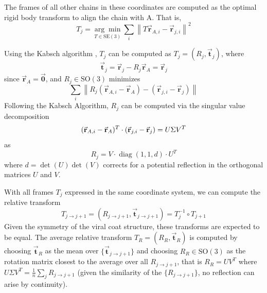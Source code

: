 The frames of all other chains in these coordinates are computed as the optimal rigid body transform to align the chain with A. That is,
\begin{equation}
T_j = \underset{T \in \mathrm{SE}(3)}{\arg\min} \sum_i \left\| T\vec{\mathbf{r}}_{A,i} - \vec{\mathbf{r}}_{j,i} \right\|^2
\end{equation}

Using the Kabsch algorithm \cite{Lawrence_2019}, $T_j$ can be computed as $T_j = (R_j, \vec{\mathbf{t}}_j)$, where 
\begin{equation}
    \vec{\mathbf{t}}_j= \vec{\mathbf{r}}_j - R_j\vec{\mathbf{r}}_A =\vec{\mathbf{r}}_j
\end{equation}    
since $\vec{\mathbf{r}}_A=\vec{\mathbf{0}}$, and $R_j \in \mathrm{SO}(3)$ minimizes 
\begin{equation}
\sum_{i} \left\| R_j(\vec{\mathbf{r}}_{A,i} - \vec{\mathbf{r}}_{A})  - (\vec{\mathbf{r}}_{j,i} - \vec{\mathbf{r}}_{j})\right\|
\end{equation}
Following the Kabsch Algorithm, $R_j$ can be computed via the singular value decomposition 
\begin{equation}
    (\vec{\mathbf{r}}_{A,i} - \vec{\mathbf{r}}_{A})^T  \cdot (\vec{\mathbf{r}}_{j,i} - \vec{\mathbf{r}}_{j}) = U\Sigma V^T \\
\end{equation}
as 
\begin{equation}
R_j = V\cdot \operatorname{diag}(1, 1, d)\cdot U^T
\end{equation}
where $d = \det(U)\det(V)$ corrects for a potential reflection in the orthogonal matrices $U$ and $V$.

With all frames $T_j$ expressed in the same coordinate system, we can compute the relative transform
\begin{equation}
T_{j\rightarrow j+1} = (R_{j\rightarrow j+1}, \vec{\mathbf{t}}_{j\rightarrow j+1}) = T_j^{-1}\circ T_{j+1}
\end{equation}
Given the symmetry of the viral coat structure, these transforms are expected to be equal. The average relative transform $T_R = (R_R, \vec{\mathbf{t}}_R)$ is computed by choosing $\vec{\mathbf{t}}_R$ as the mean over $\{\vec{\mathbf{t}}_{j\rightarrow j+1}\}$ and choosing $R_R \in \mathrm{SO}(3)$ as the rotation matrix closest to the average over all $R_{j\rightarrow j+1}$, that is $R_R=UV^T$ where $U\Sigma V^T = \frac{1}{n}\sum_j R_{j\rightarrow j+1}$ \cite{Sarabandi2023} (given the similarity of the $\{R_{j\rightarrow j+1}\}$, no reflection can arise by continuity). 

